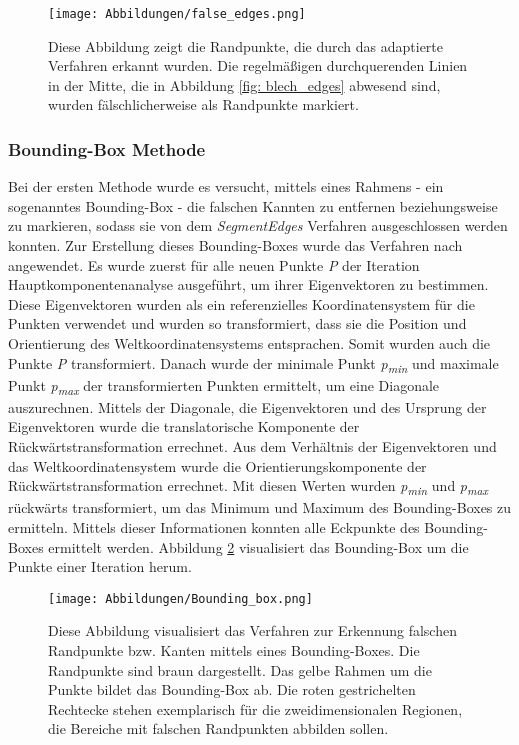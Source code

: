 \begin{figure}[h]
	\texttt{[image: Abbildungen/false\_edges.png]}
	\centering
	\caption{Diese Abbildung zeigt die Randpunkte, die durch das adaptierte Verfahren erkannt wurden. Die regelmäßigen durchquerenden Linien in der Mitte, die in Abbildung \ref{fig: blech_edges} abwesend sind, wurden fälschlicherweise als Randpunkte markiert. }
	\label{fig: false_edges}
\end{figure}

\subsubsection{Bounding-Box Methode}
Bei der ersten Methode wurde es versucht, mittels eines Rahmens - ein sogenanntes Bounding-Box - die falschen Kannten zu entfernen beziehungsweise zu markieren, sodass sie von dem \textit{SegmentEdges} Verfahren ausgeschlossen werden konnten. Zur Erstellung dieses Bounding-Boxes wurde das Verfahren nach \textcite{noauthor_find_2015} angewendet. Es wurde zuerst für alle neuen Punkte \textit{P} der Iteration Hauptkomponentenanalyse ausgeführt, um ihrer Eigenvektoren zu bestimmen. Diese Eigenvektoren wurden als ein referenzielles Koordinatensystem für die Punkten verwendet und wurden so transformiert, dass sie die Position und Orientierung des Weltkoordinatensystems entsprachen. Somit wurden auch die Punkte \textit{P} transformiert. Danach wurde der minimale Punkt \textit{p\textsubscript{min}} und maximale Punkt \textit{p\textsubscript{max}} der transformierten Punkten ermittelt, um eine Diagonale auszurechnen. Mittels der Diagonale, die Eigenvektoren und des Ursprung der Eigenvektoren wurde die translatorische Komponente der Rückwärtstransformation errechnet. Aus dem Verhältnis der Eigenvektoren und das Weltkoordinatensystem wurde die Orientierungskomponente der Rückwärtstransformation errechnet. Mit diesen Werten wurden \textit{p\textsubscript{min}} und \textit{p\textsubscript{max}} rückwärts transformiert, um das Minimum und Maximum des Bounding-Boxes zu ermitteln. Mittels dieser Informationen konnten alle Eckpunkte des Bounding-Boxes ermittelt werden. Abbildung \ref{fig: bounding_box} visualisiert das Bounding-Box um die Punkte einer Iteration herum.

\begin{figure}[h]
	\texttt{[image: Abbildungen/Bounding\_box.png]}
	\centering
	\caption{Diese Abbildung visualisiert das Verfahren zur Erkennung falschen Randpunkte bzw. Kanten mittels eines Bounding-Boxes. Die Randpunkte sind braun dargestellt. Das gelbe Rahmen um die Punkte bildet das Bounding-Box ab. Die roten gestrichelten Rechtecke stehen exemplarisch für die zweidimensionalen Regionen, die Bereiche mit falschen Randpunkten abbilden sollen.}
	\label{fig: bounding_box}
\end{figure}

